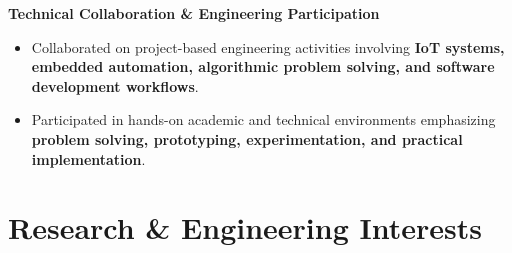 \documentclass[a4paper,11pt]{article}
\begin{document}
\vspace{6pt}

\textbf{Technical Collaboration \& Engineering Participation}

\begin{itemize}

    \item Collaborated on project-based engineering activities involving \textbf{IoT systems, embedded automation, algorithmic problem solving, and software development workflows}.

    \item Participated in hands-on academic and technical environments emphasizing \textbf{problem solving, prototyping, experimentation, and practical implementation}.

\end{itemize}







\section{Research \& Engineering Interests}
\end{document}
